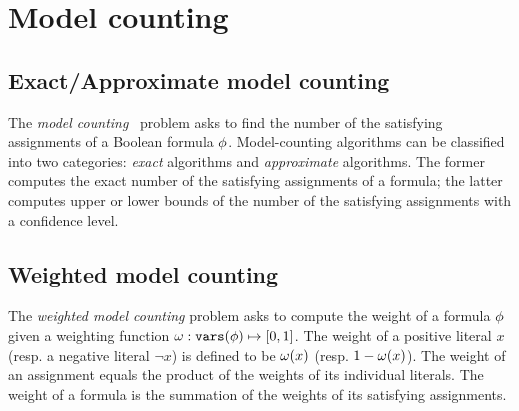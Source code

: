 \section{Model counting}
\label{sect:background-model-counting}

\subsection{Exact/Approximate model counting}
The \textit{model counting}~\cite{SATHandbook-ModelCounting} problem asks to find the number of the satisfying assignments of a Boolean formula $\phi$.
Model-counting algorithms can be classified into two categories:
\textit{exact} algorithms and \textit{approximate} algorithms.
The former computes the exact number of the satisfying assignments of a formula;
the latter computes upper or lower bounds of the number of the satisfying assignments with a confidence level.

\subsection{Weighted model counting}
The \textit{weighted model counting} problem asks to compute the weight of a formula $\phi$ given a weighting function $\omega:\texttt{vars}(\phi)\mapsto[0,1]$.
The weight of a positive literal $x$ (resp. a negative literal $\lnot x$) is defined to be $\omega(x)$ (resp. $1-\omega(x)$).
The weight of an assignment equals the product of the weights of its individual literals.
The weight of a formula is the summation of the weights of its satisfying assignments.